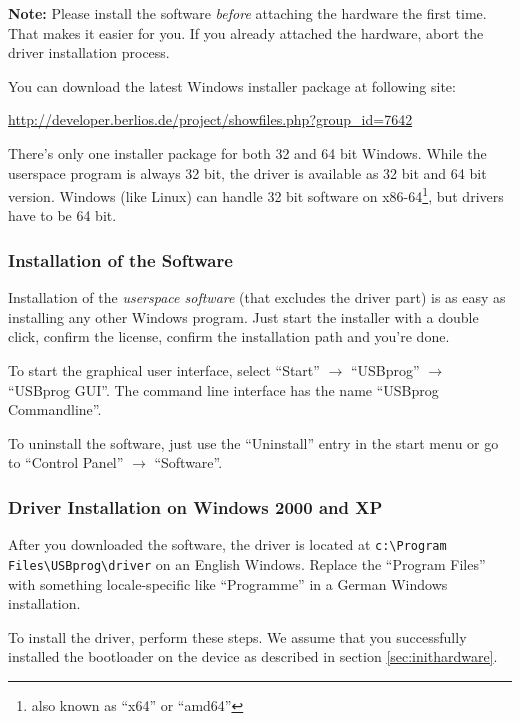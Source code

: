 \documentclass[bibtotoc,UKenglish,halfparskip,oneside,DIV12]{scrreprt}
\begin{document}
\textbf{Note:} Please install the software \emph{before} attaching the hardware the first time. That
makes it easier for you. If you already attached the hardware, abort the driver installation
process.

You can download the latest Windows installer package at following site:

 \url{http://developer.berlios.de/project/showfiles.php?group_id=7642}

There's only one installer package for both 32 and 64 bit Windows. While the userspace program is
always 32 bit, the driver is available as 32 bit and 64 bit version. Windows (like Linux) can handle
32 bit software on x86-64\footnote{also known as ``x64'' or ``amd64''}, but drivers have to be 64
bit.


\subsubsection{Installation of the Software}

Installation of the \emph{userspace software} (that excludes the driver part) is as easy as
installing any other Windows program. Just start the installer with a double click, confirm the
license, confirm the installation path and you're done.

To start the graphical user interface, select ``Start'' $\rightarrow$ ``USBprog''
$\rightarrow$ ``USBprog GUI''. The command line interface has the name ``USBprog Commandline''.

To uninstall the software, just use the ``Uninstall'' entry in the start menu or go to ``Control
Panel'' $\rightarrow$ ``Software''.


\subsubsection{Driver Installation on Windows 2000 and XP}

After you downloaded the software, the driver is located at \texttt{c:\textbackslash{}Program
Files\textbackslash{}USBprog\textbackslash{}driver} on an English Windows. Replace the ``Program
Files'' with something locale-specific like ``Programme'' in a German Windows installation.

To install the driver, perform these steps. We assume that you successfully installed the bootloader
on the device as described in section \vref{sec:inithardware}.
\end{document}
